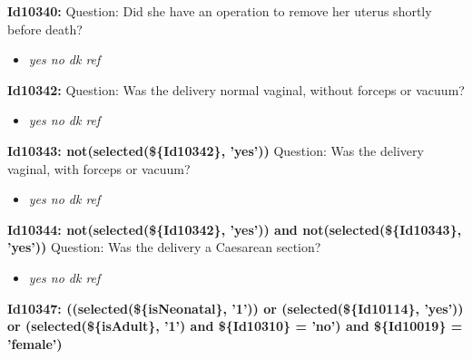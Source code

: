 \documentclass{article}%
\begin{document}
\textbf{Id10340: \newline%
}%
Question: Did she have an operation to remove her uterus shortly before death?\newline%
%
\begin{itemize}%
\item%
\textit{yes\newline%
 no\newline%
 dk\newline%
 ref\newline%
}%
\end{itemize}%
\textbf{Id10342: \newline%
}%
Question: Was the delivery normal vaginal, without forceps or vacuum?\newline%
%
\begin{itemize}%
\item%
\textit{yes\newline%
 no\newline%
 dk\newline%
 ref\newline%
}%
\end{itemize}%
\textbf{Id10343: not(selected(\$\{Id10342\}, 'yes'))\newline%
}%
Question: Was the delivery vaginal, with forceps or vacuum?\newline%
%
\begin{itemize}%
\item%
\textit{yes\newline%
 no\newline%
 dk\newline%
 ref\newline%
}%
\end{itemize}%
\textbf{Id10344: not(selected(\$\{Id10342\}, 'yes')) and not(selected(\$\{Id10343\}, 'yes'))\newline%
}%
Question: Was the delivery a Caesarean section?\newline%
%
\begin{itemize}%
\item%
\textit{yes\newline%
 no\newline%
 dk\newline%
 ref\newline%
}%
\end{itemize}%
\textbf{Id10347: ((selected(\$\{isNeonatal\}, '1')) or (selected(\$\{Id10114\}, 'yes')) or (selected(\$\{isAdult\}, '1') and \$\{Id10310\} = 'no') and \$\{Id10019\} = 'female')\newline%
}%
\end{document}

